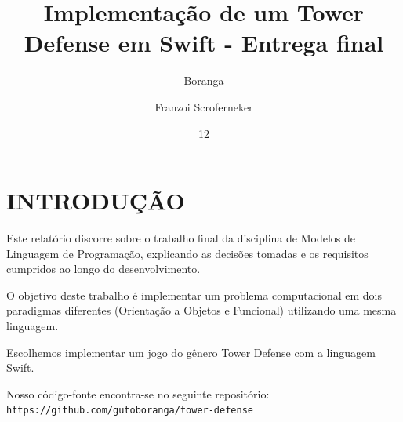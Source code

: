 \documentclass[rel_mlp]{iiufrgs}
\title{Implementação de um Tower Defense em Swift - Entrega final}
\author{Boranga}{Augusto} %
\author{Franzoi Scroferneker}{Rodrigo} %
\date{12}{2017}
\newcommand\tab[1][1cm]{\hspace*{#1}}
\begin{document}
\maketitle


\nocite{tower_defense}
\nocite{best_tower_defense}
\nocite{swift}
\nocite{why_learn_swift}
\nocite{o_que_e_paradigma}
\nocite{how_to_use_bibtex}
\nocite{functional_swift_fold_it_baby}
\nocite{an_introduction_to_functional_programming_in_swift}
\nocite{swift_apple_developer_functions}
\nocite{intro_to_swift_functional_programming_with_bob}
\nocite{geison_medium_functional_swift}
\nocite{catp_01}
\nocite{stack_overflow_developer_survey_results}


\tableofcontents






%

\chapter{INTRODUÇÃO} \label{intro}

Este relatório discorre sobre o trabalho final da disciplina de Modelos de Linguagem de Programação, explicando as decisões tomadas e os requisitos cumpridos ao longo do desenvolvimento.

O objetivo deste trabalho é implementar um problema computacional em dois paradigmas diferentes (Orientação a Objetos e Funcional) utilizando uma mesma linguagem.

Escolhemos implementar um jogo do gênero Tower Defense com a linguagem Swift.


Nosso código-fonte encontra-se no seguinte repositório:
\texttt{\\\tab https://github.com/gutoboranga/tower-defense}

%
\end{document}
